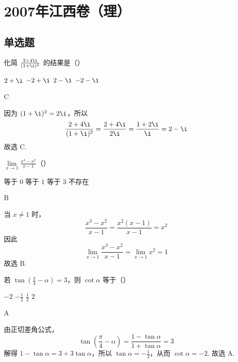 \chapter{2007年江西卷（理）}

\section{单选题}

\begin{problem}
化简 \(\frac{2 + 4\i}{(1 + \i)^2}\) 的结果是（\quad）

\choices
    {\(2 + \i\)}
    {\(-2 + \i\)}
    {\(2 - \i\)}
    {\(-2 - \i\)}
\end{problem}

\begin{answer}
C
\end{answer}

\begin{solution}
因为 \((1+\i)^2=2\i\)，所以
\[
\frac{2+4\i}{(1+\i)^2}=\frac{2+4\i}{2\i}=\frac{1+2\i}{\i}=2-\i
\]
故选 C.
\end{solution}

\begin{problem}
\(\displaystyle \lim\limits_{x\to 1}\frac{x^3 - x^2}{x - 1}\)（\quad）

\choices
    {等于 \(0\)}
    {等于 \(1\)}
    {等于 \(3\)}
    {不存在}
\end{problem}

\begin{answer}
B
\end{answer}

\begin{solution}
当 \(x\ne1\) 时，
\[
\frac{x^3-x^2}{x-1}=\frac{x^2(x-1)}{x-1}=x^2
\]
因此
\[
\displaystyle\lim\limits_{x\to1}\frac{x^3-x^2}{x-1}=\lim\limits_{x\to1}x^2=1
\]
故选 B.
\end{solution}

\begin{problem}
若 \(\tan \left(\frac{\pi}{4} - \alpha\right) = 3\)，则 \(\cot \alpha\) 等于（\quad）

\choices
    {\(-2\)}
    {\(-\frac{1}{2}\)}
    {\(\frac{1}{2}\)}
    {\(2\)}
\end{problem}

\begin{answer}
A
\end{answer}

\begin{solution}
由正切差角公式，
\[
\tan\left(\frac{\pi}{4}-\alpha\right)=\frac{1-\tan\alpha}{1+\tan\alpha}=3
\]
解得 \(1-\tan\alpha=3+3\tan\alpha\)，所以 \(\tan\alpha=-\frac12\)，从而 \(\cot\alpha=-2\).
故选 A.
\end{solution}

